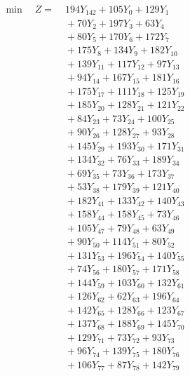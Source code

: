 \documentclass[a4paper,10pt]{article}
\begin{document}
\allowdisplaybreaks
{\small
\begin{align}
\min \quad Z = &\; 194 Y_{142} + 105 Y_{0} + 129 Y_{1} \\[0.3ex]
&\;  + 70 Y_{2} + 197 Y_{3} + 63 Y_{4} \\[0.3ex]
&\;  + 80 Y_{5} + 170 Y_{6} + 172 Y_{7} \\[0.3ex]
&\;  + 175 Y_{8} + 134 Y_{9} + 182 Y_{10} \\[0.3ex]
&\;  + 139 Y_{11} + 117 Y_{12} + 97 Y_{13} \\[0.3ex]
&\;  + 94 Y_{14} + 167 Y_{15} + 181 Y_{16} \\[0.3ex]
&\;  + 175 Y_{17} + 111 Y_{18} + 125 Y_{19} \\[0.3ex]
&\;  + 185 Y_{20} + 128 Y_{21} + 121 Y_{22} \\[0.3ex]
&\;  + 84 Y_{23} + 73 Y_{24} + 100 Y_{25} \\[0.3ex]
&\;  + 90 Y_{26} + 128 Y_{27} + 93 Y_{28} \\[0.5ex]\allowbreak
&\;  + 145 Y_{29} + 193 Y_{30} + 171 Y_{31} \\[0.3ex]
&\;  + 134 Y_{32} + 76 Y_{33} + 189 Y_{34} \\[0.3ex]
&\;  + 69 Y_{35} + 73 Y_{36} + 173 Y_{37} \\[0.3ex]
&\;  + 53 Y_{38} + 179 Y_{39} + 121 Y_{40} \\[0.3ex]
&\;  + 182 Y_{41} + 133 Y_{42} + 140 Y_{43} \\[0.3ex]
&\;  + 158 Y_{44} + 158 Y_{45} + 73 Y_{46} \\[0.3ex]
&\;  + 105 Y_{47} + 79 Y_{48} + 63 Y_{49} \\[0.3ex]
&\;  + 90 Y_{50} + 114 Y_{51} + 80 Y_{52} \\[0.3ex]
&\;  + 131 Y_{53} + 196 Y_{54} + 140 Y_{55} \\[0.3ex]
&\;  + 74 Y_{56} + 180 Y_{57} + 171 Y_{58} \\[0.5ex]\allowbreak
&\;  + 144 Y_{59} + 103 Y_{60} + 132 Y_{61} \\[0.3ex]
&\;  + 126 Y_{62} + 62 Y_{63} + 196 Y_{64} \\[0.3ex]
&\;  + 142 Y_{65} + 128 Y_{66} + 123 Y_{67} \\[0.3ex]
&\;  + 137 Y_{68} + 188 Y_{69} + 145 Y_{70} \\[0.3ex]
&\;  + 129 Y_{71} + 73 Y_{72} + 93 Y_{73} \\[0.3ex]
&\;  + 96 Y_{74} + 139 Y_{75} + 180 Y_{76} \\[0.3ex]
&\;  + 106 Y_{77} + 87 Y_{78} + 142 Y_{79} \\[0.3ex]

\end{align}}
\end{document}
